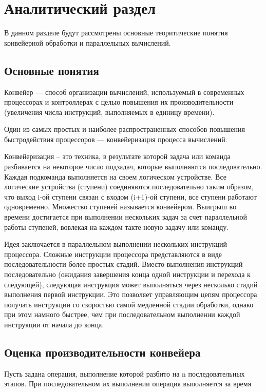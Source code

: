 \chapter{ Аналитический раздел}
\label{cha:analytical}
    В данном разделе будут рассмотрены основные теоритические понятия конвейерной обработки и параллельных вычислений.

    \section{Основные понятия}
Конвейер — способ организации вычислений, используемый в современных процессорах и контроллерах с целью повышения их производительности (увеличения числа инструкций, выполняемых в единицу времени).

Один из самых простых и наиболее распространенных способов повышения быстродействия процессоров — конвейеризация процесса вычислений.

Конвейеризация – это техника, в результате которой задача или  команда разбивается  на некоторое число подзадач, которые  выполняются последовательно.
Каждая  подкоманда   выполняется на своем логическом  устройстве.
Все логические устройства (ступени) соединяются последовательно таким образом, что выход i-ой  ступени  связан   с   входом   (i+1)-ой   ступени,  все ступени  работают  одновременно.
Множество  ступеней называется конвейером. Выигрыш во времени достигается при выполнении  нескольких задач  за  счет параллельной   работы   ступеней,  вовлекая  на  каждом такте новую задачу или команду.

Идея заключается в параллельном выполнении нескольких инструкций процессора. Сложные инструкции процессора представляются в виде последовательности более простых стадий. Вместо выполнения инструкций последовательно (ожидания завершения конца одной инструкции и перехода к следующей), следующая инструкция может выполняться через несколько стадий выполнения первой инструкции. Это позволяет управляющим цепям процессора получать инструкции со скоростью самой медленной стадии обработки, однако при этом намного быстрее, чем при последовательном выполнении каждой инструкции от начала до конца.

    \section{Оценка производительности конвейера}
Пусть задана операция, выполнение которой разбито на n последовательных этапов. При последовательном их выполнении операция выполняется за время

